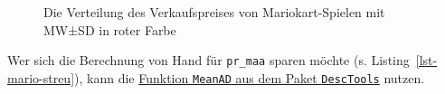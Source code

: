 \documentclass[
  letterpaper,
]{scrbook}
\theoremstyle{definition}
\theoremstyle{definition}
\theoremstyle{definition}
\theoremstyle{remark}
\begin{document}
\begin{figure}

\begin{minipage}{0.50\linewidth}



\end{minipage}%
%
\begin{minipage}{0.50\linewidth}



\end{minipage}%

\caption{\label{fig-var}Die Verteilung des Verkaufspreises von
Mariokart-Spielen mit MW±SD in roter Farbe}

\end{figure}%

Wer sich die Berechnung von Hand für \texttt{pr\_maa} sparen möchte (s.
Listing~\ref{lst-mario-streu}), kann die
\href{https://rdrr.io/cran/DescTools/man/MeanAD.html}{Funktion
\texttt{MeanAD} aus dem Paket \texttt{DescTools}} nutzen.
\end{document}

